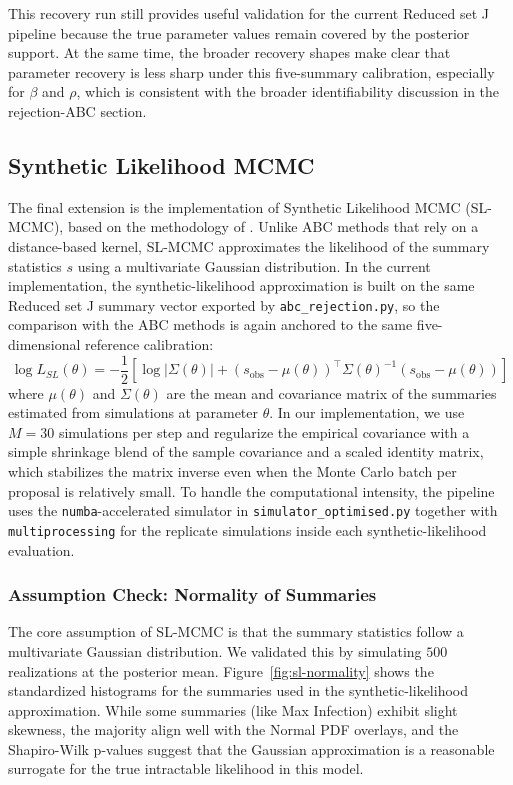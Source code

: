 \documentclass[11pt]{article}
\begin{document}
This recovery run still provides useful validation for the current Reduced set J pipeline because the true parameter values remain covered by the posterior support. At the same time, the broader recovery shapes make clear that parameter recovery is less sharp under this five-summary calibration, especially for $\beta$ and $\rho$, which is consistent with the broader identifiability discussion in the rejection-ABC section.

\subsection{Synthetic Likelihood MCMC}

The final extension is the implementation of Synthetic Likelihood MCMC (SL-MCMC), based on the methodology of \citet{wood2010}. Unlike ABC methods that rely on a distance-based kernel, SL-MCMC approximates the likelihood of the summary statistics $s$ using a multivariate Gaussian distribution. In the current implementation, the synthetic-likelihood approximation is built on the same Reduced set J summary vector exported by \texttt{abc\_rejection.py}, so the comparison with the ABC methods is again anchored to the same five-dimensional reference calibration:
\[
\log L_{SL}(\theta) = -\frac{1}{2} \left[ \log |\Sigma(\theta)| + (s_{\text{obs}} - \mu(\theta))^\top \Sigma(\theta)^{-1} (s_{\text{obs}} - \mu(\theta)) \right]
\]
where $\mu(\theta)$ and $\Sigma(\theta)$ are the mean and covariance matrix of the summaries estimated from simulations at parameter $\theta$. In our implementation, we use $M=30$ simulations per step and regularize the empirical covariance with a simple shrinkage blend of the sample covariance and a scaled identity matrix, which stabilizes the matrix inverse even when the Monte Carlo batch per proposal is relatively small. To handle the computational intensity, the pipeline uses the \texttt{numba}-accelerated simulator in \texttt{simulator\_optimised.py} together with \texttt{multiprocessing} for the replicate simulations inside each synthetic-likelihood evaluation.

\subsubsection{Assumption Check: Normality of Summaries}

The core assumption of SL-MCMC is that the summary statistics follow a multivariate Gaussian distribution. We validated this by simulating $500$ realizations at the posterior mean. Figure~\ref{fig:sl-normality} shows the standardized histograms for the summaries used in the synthetic-likelihood approximation. While some summaries (like Max Infection) exhibit slight skewness, the majority align well with the Normal PDF overlays, and the Shapiro-Wilk p-values suggest that the Gaussian approximation is a reasonable surrogate for the true intractable likelihood in this model.
\end{document}
